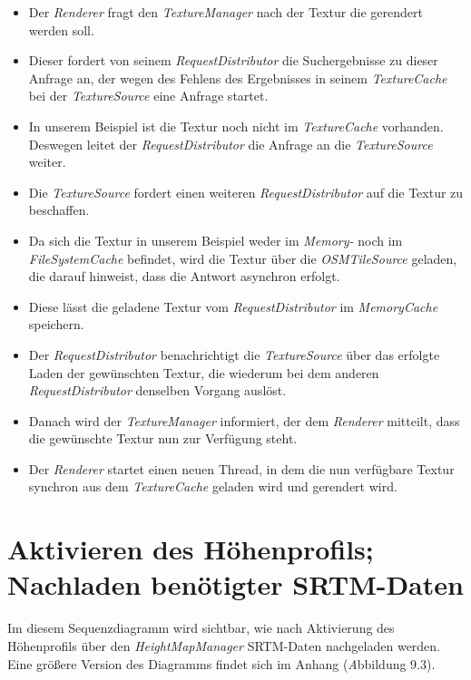 \documentclass[10pt]{scrreprt}
\newcommand{\textref}[1]{\mbox{\raisebox{0.1ex}{\small$\rightarrow$ }\textit{#1}}}
\begin{document}
\begin{itemize}
\item Der \textit{Renderer} fragt den \textit{TextureManager} nach der Textur die gerendert werden soll.
\item Dieser fordert von seinem \textit{RequestDistributor} die Suchergebnisse zu dieser Anfrage an, der wegen des Fehlens des Ergebnisses in seinem \textit{TextureCache} bei der \textit{TextureSource} eine Anfrage startet.
\item In unserem Beispiel ist die Textur noch nicht im \textit{TextureCache} vorhanden. Deswegen leitet der \textit{RequestDistributor} die Anfrage an die \textit{TextureSource} weiter.
\item Die \textit{TextureSource} fordert einen weiteren \textit{RequestDistributor} auf die Textur zu beschaffen.
\item Da sich die Textur in unserem Beispiel weder im \textit{Memory-} noch im \textit{FileSystemCache} befindet, wird die Textur über die \textit{OSMTileSource} geladen, die darauf hinweist, dass die Antwort asynchron erfolgt.
\item Diese lässt die geladene Textur vom \textit{RequestDistributor} im \textit{MemoryCache} speichern.
\item Der \textit{RequestDistributor} benachrichtigt die \textit{TextureSource} über das erfolgte Laden der gewünschten Textur, die wiederum bei dem anderen \textit{RequestDistributor} denselben Vorgang auslöst.
\item Danach wird der \textit{TextureManager} informiert, der dem \textit{Renderer} mitteilt, dass die gewünschte Textur nun zur Verfügung steht.
\item Der \textit{Renderer} startet einen neuen Thread, in dem die nun verfügbare Textur synchron aus dem \textit{TextureCache} geladen wird und gerendert wird.
\end{itemize}


\newpage

\section{Aktivieren des Höhenprofils; Nachladen benötigter SRTM-Daten}
Im diesem Sequenzdiagramm wird sichtbar, wie nach Aktivierung des Höhenprofils über den \textit{HeightMapManager} SRTM-Daten nachgeladen werden.
Eine größere Version des Diagramms findet sich im Anhang (\textref Abbildung 9.3).
\end{document}
